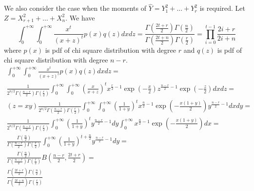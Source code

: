 \documentclass{article}
\begin{document}
We also consider the case when the moments of $\hat{Y} = Y_1^2 + \dots + Y_r^2$ is required. Let $Z = X_{r+1}^2 + \dots + X_n^2$. We have
\begin{equation}\label{eq:n4}
\int_{0}^{+\infty}\int_{0}^{+\infty} \frac{x^t}{(x+z)^t} p(x)q(z) dxdz = \frac{\Gamma(\frac{2t+r}{2})\Gamma(\frac{n}{2})}{\Gamma(\frac{2t+n}{2})\Gamma(\frac{r}{2})} = \prod_{i=0}^{t-1} \frac{2i+r}{2i+n}
\end{equation}
where $p(x)$ is pdf of chi square distribution with degree $r$ and $q(z)$ is pdf of chi square distribution with degree $n-r$.
\begin{align*}
\int_{0}^{+\infty}\int_{0}^{+\infty} \frac{x^t}{(x+z)^t} p(x)q(z) dxdz =
& \\ \frac{1}{2^{n/2} \Gamma(\frac{n-r}{2})\Gamma(\frac{r}{2})}\int_{0}^{+\infty}\int_{0}^{+\infty}\left(\frac{x}{x+z}\right)^t x^{\frac{r}{2}-1}\exp(-\frac{x}{2})z^{\frac{n-r}{2}-1}\exp(-\frac{z}{2})dxdz =
& \\ (z=xy) \frac{1}{2^{n/2} \Gamma(\frac{n-r}{2})\Gamma(\frac{r}{2})}\int_{0}^{+\infty}\int_{0}^{+\infty}\left(\frac{1}{1+y}\right)^t x^{\frac{n}{2}-1}\exp(-\frac{x(1+y)}{2})y^{\frac{n-r}{2}-1}dxdy =
& \\  \frac{1}{2^{n/2} \Gamma(\frac{n-r}{2})\Gamma(\frac{r}{2})}\int_{0}^{+\infty}\left(\frac{1}{1+y}\right)^t y^{\frac{n-r}{2}-1} dy\int_{0}^{+\infty} x^{\frac{n}{2}-1}\exp(-\frac{x(1+y)}{2})dx =
& \\  \frac{\Gamma(\frac{n}{2})}{\Gamma(\frac{n-r}{2})\Gamma(\frac{r}{2})}\int_{0}^{+\infty}\left(\frac{1}{1+y}\right)^{t+\frac{n}{2}} y^{\frac{n-r}{2}-1} dy =
& \\  \frac{\Gamma(\frac{n}{2})}{\Gamma(\frac{n-r}{2})\Gamma(\frac{r}{2})} B(\frac{n-r}{2}, \frac{2t+r}{2}) =
& \\ \frac{\Gamma(\frac{2t+r}{2})\Gamma(\frac{n}{2})}{\Gamma(\frac{2t+n}{2})\Gamma(\frac{r}{2})}
\end{align*}
\end{document}
